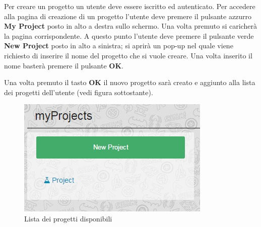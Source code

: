 Per creare un progetto un utente deve essere iscritto ed autenticato. Per accedere alla pagina di creazione di un progetto l'utente deve premere il pulsante azzurro \textbf{My Project} posto in alto a destra sullo schermo. Una volta premuto si caricherà la pagina corrispondente. A questo punto l'utente deve premere il pulsante verde \textbf{New Project} posto in alto a sinistra; si aprirà un pop-up nel quale viene richiesto di inserire il nome del progetto che si vuole creare. Una volta inserito il nome basterà premere il pulsante \textbf{OK}.


\noindent Una volta premuto il tasto \textbf{OK} il nuovo progetto sarà creato e aggiunto alla lista dei progetti dell'utente (vedi figura sottostante).


\begin{figure}[H] 
	\centering 
	\includegraphics[scale=0.60] {img/projectlist}
	\caption{Lista dei progetti disponibili} 
\end{figure}